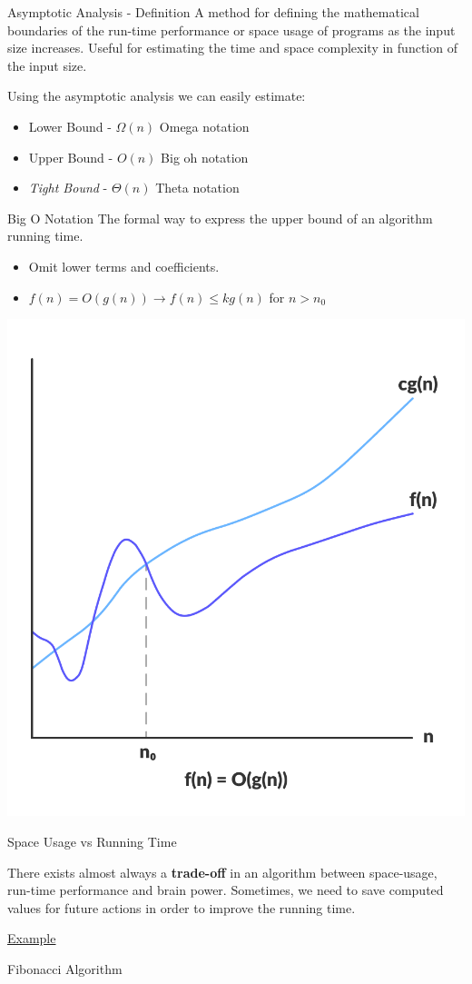 \documentclass{beamer}
\begin{document}
\begin{frame}{Asymptotic Analysis - Definition}
	A method for defining the mathematical boundaries of the run-time performance or space usage of programs as the input size increases. Useful for estimating the time and space complexity in function of the input size.

	Using the asymptotic analysis we can easily estimate:
	\begin{itemize}
		\item Lower Bound - $\Omega(n)$ Omega notation
		\item Upper Bound - $O(n)$ Big oh notation
		\item \textit{Tight Bound} - $\Theta(n)$ Theta notation
	\end{itemize}
\end{frame}

\begin{frame}{Big O Notation}
	The formal way to express the upper bound of an algorithm running time.
	
	\begin{itemize}
		\item Omit lower terms and coefficients.
		\item $f(n) = O(g(n)) \rightarrow f(n) \leq kg(n)$ for $n > n_0$
	\end{itemize}

	\begin{center}
		\includegraphics[width=.35\linewidth]{../img/bigO}
	\end{center}
\end{frame}

\begin{frame}{Space Usage vs Running Time}

	There exists almost always a \textbf{trade-off} in an algorithm between space-usage, run-time performance and brain power. Sometimes, we need to save computed values for future actions in order to improve the running time.

	\underline{Example}

	Fibonacci Algorithm

\end{frame}
\end{document}
